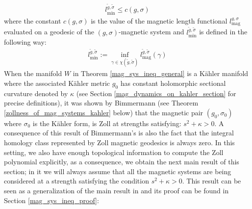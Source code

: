 \documentclass[11pt]{amsart}
\theoremstyle{plain}
\theoremstyle{definition}
\theoremstyle{remark}
\begin{document}
\begin{align}
    l_{\text{min}}^{\tilde g,\tilde\sigma} \leq c(g,\sigma)  
\end{align}
where the constant $c(g,\sigma)$ is the value of the magnetic length functional $l^{g,\sigma}_{\text{mag}}$ evaluated on a geodesic of the $(g,\sigma)$-magnetic system and $l_{\text{min}}^{\tilde g,\tilde\sigma}$ is defined in the following way:
\begin{align}\label{l_min_def_equation}
    l_{\text{min}}^{\tilde g,\tilde\sigma}:= \inf_{\gamma\in \chi(\tilde g,\tilde\sigma)} l_{\text{mag}}^{\tilde g,\tilde\sigma}(\gamma) 
\end{align}
When the manifold $W$ in Theorem \ref{mag_sys_ineq_general} is a K\"ahler manifold where the associated K\"ahler metric $g_0$ has constant holomorphic sectional curvature denoted by $\kappa$ (see Section \ref{mag_dynamics_on_kahler_section} for precise definitions), it was shown by Bimmermann (see Theorem \ref{zollness_of_mag_systems_kahler} below) that the magnetic pair $(g_0,\sigma_0)$ where $\sigma_0$ is the K\"ahler form, is Zoll at strengths satisfying: $s^2+\kappa >0$. A consequence of this result of Bimmermann's is also the fact that the integral homology class represented by Zoll magnetic geodesics is always zero. In this setting, we also have enough topological information to compute the Zoll polynomial explicitly, as a consequence, we obtain the next main result of this section; in it we will always assume that all the magnetic systems are being considered at a strength satisfying the condition $s^2+\kappa>0$. This result can be seen as a generalization of the main result in \cite{BK-mag_surfaces} and its proof can be found in Section \ref{mag_sys_ineq_proof}:
\end{document}
